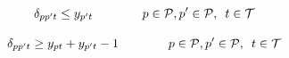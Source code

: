 \begin{equation}
    \delta_{pp't} \leq y_{p't}  \qquad\qquad p \in \mathcal{P}, p' \in \mathcal{P}, \enskip t \in \mathcal{T}
\end{equation}

\begin{equation}
    \delta_{pp't} \geq y_{pt} + y_{p't} - 1  \qquad\qquad p \in \mathcal{P}, p' \in \mathcal{P}, \enskip t \in \mathcal{T}
\end{equation}

